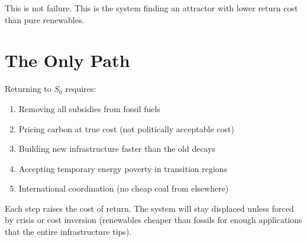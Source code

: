 \documentclass[12pt]{article}
\begin{document}
This is not failure. This is the system finding an attractor with lower return cost than pure renewables.

\section{The Only Path}

Returning to $S_0$ requires:
\begin{enumerate}
\item Removing all subsidies from fossil fuels
\item Pricing carbon at true cost (not politically acceptable cost)
\item Building new infrastructure faster than the old decays
\item Accepting temporary energy poverty in transition regions
\item International coordination (no cheap coal from elsewhere)
\end{enumerate}

Each step raises the cost of return. The system will stay displaced unless forced by crisis or cost inversion (renewables cheaper than fossils for enough applications that the entire infrastructure tips).
\end{document}
